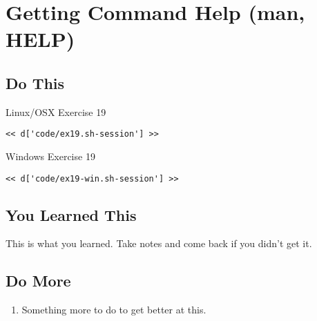 \chapter{Getting Command Help (man, HELP)}

\section{Do This}

\begin{code}{Linux/OSX Exercise 19}
\begin{Verbatim}
<< d['code/ex19.sh-session'] >>
\end{Verbatim}
\end{code}

\begin{code}{Windows Exercise 19}
\begin{Verbatim}
<< d['code/ex19-win.sh-session'] >>
\end{Verbatim}
\end{code}

\section{You Learned This}

This is what you learned.  Take notes and come back if you didn't get it.

\section{Do More}

\begin{enumerate}
\item Something more to do to get better at this.
\end{enumerate}

